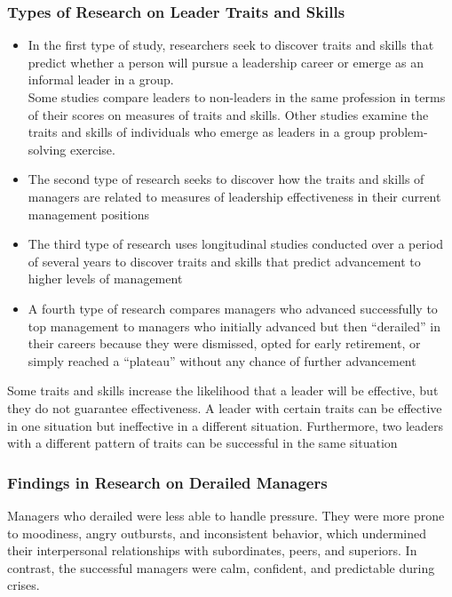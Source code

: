 
\subsubsection{Types of Research on Leader Traits and Skills} %
\label{ssub:types_of_research_on_leader_traits_and_skills}

\begin{itemize}
	\item In the first type of study, researchers seek to discover traits and skills that predict whether a person will pursue a leadership career or emerge as an informal leader in a group. 
		\\Some studies compare leaders to non-leaders in the same profession in terms of their scores on measures of traits and skills. Other studies examine the traits and skills of individuals who emerge as leaders in a group problem-solving exercise.
	\item The second type of research seeks to discover how the traits and skills of managers are related to measures of leadership effectiveness in their current management positions
	\item The third type of research uses longitudinal studies conducted over a period of several years to discover traits and skills that predict advancement to higher levels of management
	\item A fourth type of research compares managers who advanced successfully to top management to managers who initially advanced but then “derailed” in their careers because they were dismissed, opted for early retirement, or simply reached a “plateau” without any chance of further advancement
\end{itemize}

Some traits and skills increase the likelihood that a leader will be effective, but they do not guarantee effectiveness. A leader with certain traits can be effective in one situation but ineffective in a different situation. Furthermore, two leaders with a different pattern of traits can be successful in the same situation

	
\subsubsection{Findings in Research on Derailed Managers} %
\label{ssub:findings_in_research_on_derailed_managers}
Managers who derailed were less able to handle pressure. They were more prone to moodiness, angry outbursts, and inconsistent behavior, which undermined their interpersonal relationships with subordinates, peers, and superiors. In contrast, the successful managers were calm, confident, and predictable during crises.

